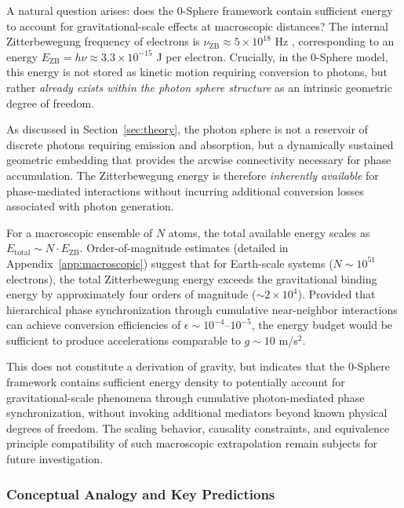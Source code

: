 \documentclass[%
 reprint,
 amsmath,amssymb,
 aps,
 prb,
]{revtex4-2}
\numberwithin{equation}{section}
\begin{document}
A natural question arises: does the 0-Sphere framework contain sufficient energy to account for gravitational-scale effects at macroscopic distances? The internal Zitterbewegung frequency of electrons is $\nu_{\text{ZB}} \approx 5 \times 10^{18}$ Hz \cite{Hanamura2024spin}, corresponding to an energy $E_{\text{ZB}} = h\nu \approx 3.3 \times 10^{-15}$ J per electron. Crucially, in the 0-Sphere model, this energy is not stored as kinetic motion requiring conversion to photons, but rather \textit{already exists within the photon sphere structure} as an intrinsic geometric degree of freedom.

As discussed in Section~\ref{sec:theory}, the photon sphere is not a reservoir of discrete photons requiring emission and absorption, but a dynamically sustained geometric embedding that provides the arcwise connectivity necessary for phase accumulation. The Zitterbewegung energy is therefore \textit{inherently available} for phase-mediated interactions without incurring additional conversion losses associated with photon generation.

For a macroscopic ensemble of $N$ atoms, the total available energy scales as $E_{\text{total}} \sim N \cdot E_{\text{ZB}}$. Order-of-magnitude estimates (detailed in Appendix~\ref{app:macroscopic}) suggest that for Earth-scale systems ($N \sim 10^{51}$ electrons), the total Zitterbewegung energy exceeds the gravitational binding energy by approximately four orders of magnitude ($\sim 2 \times 10^4$). Provided that hierarchical phase synchronization through cumulative near-neighbor interactions can achieve conversion efficiencies of $\epsilon \sim 10^{-4}$--$10^{-5}$, the energy budget would be sufficient to produce accelerations comparable to $g \sim 10$ m/s$^2$.

This does not constitute a derivation of gravity, but indicates that the 0-Sphere framework contains sufficient energy density to potentially account for gravitational-scale phenomena through cumulative photon-mediated phase synchronization, without invoking additional mediators beyond known physical degrees of freedom. The scaling behavior, causality constraints, and equivalence principle compatibility of such macroscopic extrapolation remain subjects for future investigation.

\subsubsection{Conceptual Analogy and Key Predictions}
\end{document}
